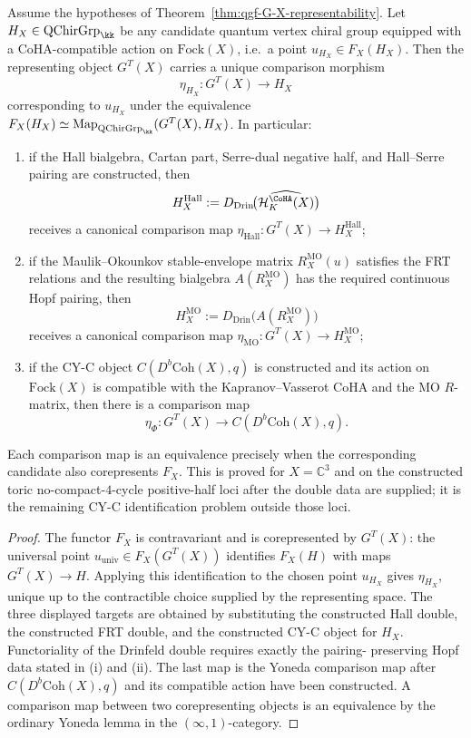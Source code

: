 \begin{proposition}
\label{prop:qgf-G-X-comparison-maps}
Assume the hypotheses of
Theorem~\ref{thm:qgf-G-X-representability}. Let
$H_X\in\mathrm{QChirGrp}_\kk$ be any candidate quantum vertex chiral
group equipped with a CoHA-compatible action on
$\mathrm{Fock}(X)$, i.e.\ a point
$u_{H_X}\in F_X(H_X)$. Then the representing object $G^T(X)$ carries
a unique comparison morphism
\[
 \eta_{H_X}\colon G^T(X)\longrightarrow H_X
\]
corresponding to $u_{H_X}$ under the equivalence
$F_X(H_X)\simeq
\mathrm{Map}_{\mathrm{QChirGrp}_\kk}(G^T(X),H_X)$. In particular:
\begin{enumerate}[label=\textup{(\roman*)}]
\item if the Hall bialgebra, Cartan part, Serre-dual negative half, and
Hall--Serre pairing are constructed, then
\[
 H_X^{\mathrm{Hall}}
 :=
 D_{\mathrm{Drin}}\!\bigl(\widehat{\mathcal H^{\CoHA}_K(X)}\bigr)
\]
receives a canonical comparison map
$\eta_{\mathrm{Hall}}\colon G^T(X)\to H_X^{\mathrm{Hall}}$;
\item if the Maulik--Okounkov stable-envelope matrix
$R_X^{\mathrm{MO}}(u)$ satisfies the FRT relations and the resulting
bialgebra $A(R_X^{\mathrm{MO}})$ has the required continuous Hopf
pairing, then
\[
 H_X^{\mathrm{MO}}
 :=
 D_{\mathrm{Drin}}\!\bigl(A(R_X^{\mathrm{MO}})\bigr)
\]
receives a canonical comparison map
$\eta_{\mathrm{MO}}\colon G^T(X)\to H_X^{\mathrm{MO}}$;
\item if the CY-C object
$C(D^b\mathrm{Coh}(X),q)$ is constructed and its action on
$\mathrm{Fock}(X)$ is compatible with the Kapranov--Vasserot CoHA and
the MO $R$-matrix, then there is a comparison map
\[
 \eta_{\Phi}\colon
 G^T(X)\longrightarrow C(D^b\mathrm{Coh}(X),q).
\]
\end{enumerate}
Each comparison map is an equivalence precisely when the corresponding
candidate also corepresents $F_X$. This is proved for
$X=\mathbb C^3$ and on the constructed toric no-compact-$4$-cycle
positive-half loci after the double data are supplied; it is the
remaining CY-C identification problem outside those loci.
\end{proposition}

\begin{proof}
The functor $F_X$ is contravariant and is corepresented by $G^T(X)$:
the universal point $u_{\mathrm{univ}}\in F_X(G^T(X))$ identifies
$F_X(H)$ with maps $G^T(X)\to H$. Applying this identification to the
chosen point $u_{H_X}$ gives $\eta_{H_X}$, unique up to the contractible
choice supplied by the representing space. The three displayed
targets are obtained by substituting the constructed Hall double, the
constructed FRT double, and the constructed CY-C object for $H_X$.
Functoriality of the Drinfeld double requires exactly the pairing-
preserving Hopf data stated in \textup{(i)} and \textup{(ii)}. The last
map is the Yoneda comparison map after
\(C(D^b\mathrm{Coh}(X),q)\) and its compatible action have been
constructed. A comparison map between two corepresenting
objects is an equivalence by the ordinary Yoneda lemma in the
$(\infty,1)$-category.
\end{proof}

